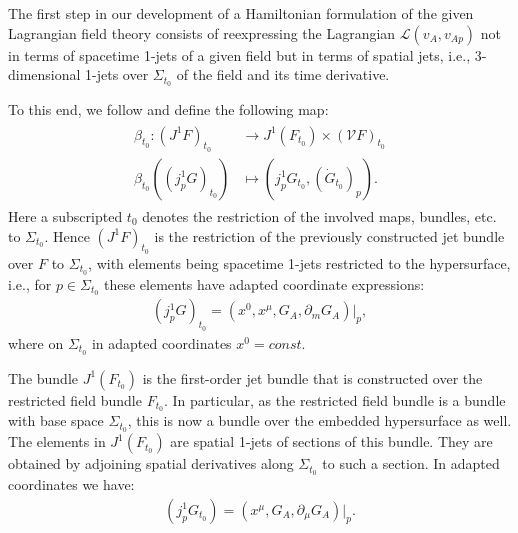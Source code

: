 The first step in our development of a Hamiltonian formulation of the given Lagrangian field theory consists of reexpressing the Lagrangian $\mathcal{L}(v_A,v_{Ap})$ not in terms of spacetime 1-jets of a given field but in terms of spatial jets, i.e., 3-dimensional 1-jets over $\Sigma_{t_0}$ of the field and its time derivative.

To this end, we follow \cite{2004math.ph..11032G} and define the following map:
\begin{align}
    \begin{aligned}
    \beta_{t_0} : (J^1F)_{t_0} &\longrightarrow J^1(F_{t_0}) \times (\mathcal{V}F)_{t_0} \\
    \beta_{t_0}((j^1_pG)_{t_0}) &\longmapsto (j^1_pG_{t_0}, (\dot{G}_{t_0})_p).
    \end{aligned}
\end{align}
Here a subscripted $t_0$ denotes the restriction of the involved maps, bundles, etc. to $\Sigma_{t_0}$. Hence $(J^1F)_{t_0}$ is the restriction of the previously constructed jet bundle over $F$ to $\Sigma_{t_0}$, with elements being spacetime 1-jets restricted to the hypersurface, i.e., for $p \in \Sigma_{t_0}$ these elements have adapted coordinate expressions: 
\begin{align}
(j^1_pG)_{t_0} = (x^0,x^{\mu},G_A,\partial_m G_A) \big \vert_p,
\end{align}
where on $\Sigma_{t_0}$ in adapted coordinates $x^0=const$. 

The bundle $J^1(F_{t_0})$ is the first-order jet bundle that is constructed over the restricted field bundle $F_{t_0}$. In particular, as the restricted field bundle is a bundle with base space $\Sigma_{t_0}$, this is now a bundle over the embedded hypersurface as well. The elements in $J^1(F_{t_0})$ are spatial 1-jets of sections of this bundle. They are obtained by adjoining spatial derivatives along $\Sigma_{t_0}$ to such a section. In adapted coordinates we have: 
\begin{align}
(j^1_pG_{t_0}) = (x^{\mu},G_A,\partial_{\mu} G_A) \big \vert_p.
\end{align}

